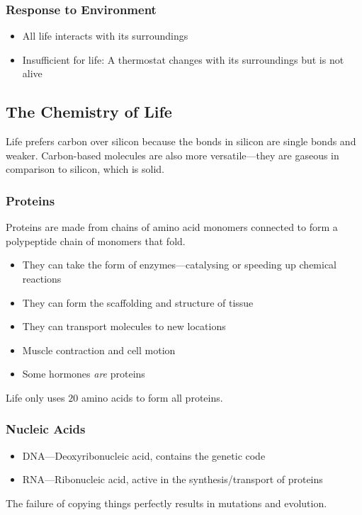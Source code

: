 \documentclass[class=article, crop=false]{standalone}
\begin{document}
  \subsubsection{Response to Environment}
  \begin{itemize}
    \item All life interacts with its surroundings
    \item Insufficient for life: A thermostat changes with its surroundings but is not alive
  \end{itemize}
  \subsection{The Chemistry of Life}
  \begin{note}{}
    Life prefers carbon over silicon because the bonds in silicon are single bonds and weaker. Carbon-based molecules are also more versatile---they are gaseous in comparison to silicon, which is solid.
  \end{note}
  \subsubsection{Proteins}
  Proteins are made from chains of amino acid monomers connected to form a polypeptide chain of monomers that fold.
  \begin{itemize}
    \item They can take the form of enzymes---catalysing or speeding up chemical reactions
    \item They can form the scaffolding and structure of tissue
    \item They can transport molecules to new locations
    \item Muscle contraction and cell motion
    \item Some hormones \emph{are} proteins
  \end{itemize}
  \begin{note}{}
    Life only uses $20$ amino acids to form all proteins.
  \end{note}
  \subsubsection{Nucleic Acids}
  \begin{itemize}
    \item DNA---Deoxyribonucleic acid, contains the genetic code
    \item RNA---Ribonucleic acid, active in the synthesis/transport of proteins
  \end{itemize}
  \begin{note}{}
    The failure of copying things perfectly results in mutations and evolution.
  \end{note}
\end{document}

